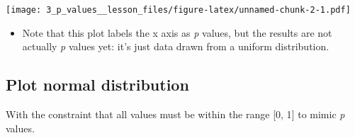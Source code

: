 \documentclass[
]{article}
\providecommand{\tightlist}{%
  \setlength{\itemsep}{0pt}\setlength{\parskip}{0pt}}
\begin{document}
\texttt{[image: 3\_p\_values\_\_lesson\_files/figure-latex/unnamed-chunk-2-1.pdf]}

\begin{itemize}
\tightlist
\item
  Note that this plot labels the x axis as \emph{p} values, but the
  results are not actually \emph{p} values yet: it's just data drawn
  from a uniform distribution.
\end{itemize}

\hypertarget{plot-normal-distribution}{%
\subsection{Plot normal distribution}\label{plot-normal-distribution}}

With the constraint that all values must be within the range {[}0, 1{]}
to mimic \emph{p} values.
\end{document}
